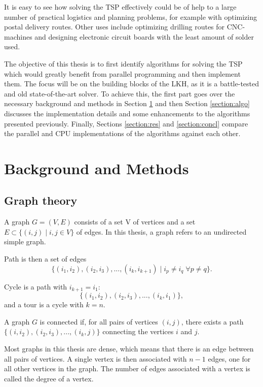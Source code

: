 \documentclass[english, 12pt, a4paper, sci, utf8, a-1b, online]{aaltothesis}
\begin{document}
It is easy to see how solving the TSP effectively could be of help to a large number of practical logistics and planning problems, for example with optimizing postal delivery routes. Other uses include optimizing drilling routes for CNC-machines and designing electronic circuit boards with the least amount of solder used.

The objective of this thesis is to first identify algorithms for solving the TSP which would greatly benefit from parallel programming and then implement them. The focus will be on the building blocks of the LKH, as it is a battle-tested and old state-of-the-art solver. To achieve this, the first part goes over the necessary background and methods in Section \ref{section:back} and then Section \ref{section:algo} discusses the implementation details and some enhancements to the algorithms presented previously. Finally, Sections \ref{section:res} and \ref{section:concl} compare the parallel and CPU implementations of the algorithms against each other.



\section{Background and Methods} \label{section:back}
\subsection{Graph theory}
A graph $G = (V, E)$ consists of a set V of vertices and a set $E \subset \{(i, j)\;|\; i, j \in V\}$ of edges. In this thesis, a graph refers to an undirected simple graph.

Path is then a set of edges 
\begin{equation*}
\{(i_1, i_2), (i_2, i_3), ..., (i_k, i_{k+1})\; | \; i_p \neq i_q \; \forall p \neq q\}.
\end{equation*}

Cycle is a path with $i_{k+1} = i_1$:
\begin{equation*}
\{(i_1, i_2), (i_2, i_3), ..., (i_k, i_{1})\},
\end{equation*}
and a tour is a cycle with $k=n$.

A graph $G$ is connected if, for all pairs of vertices $(i, j)$, there exists a path $\{(i, i_2), (i_2, i_3), ..., (i_k, j)\}$ connecting the vertices $i$ and $j$.

Most graphs in this thesis are dense, which means that there is an edge between all pairs of vertices. A single vertex is then associated with $n-1$ edges, one for all other vertices in the graph. The number of edges associated with a vertex is called the degree of a vertex.
\end{document}
